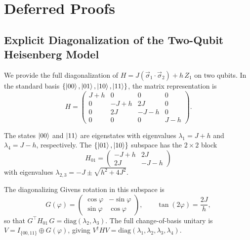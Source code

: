 \appendix

\section{Deferred Proofs}
\label{app:proofs}

\subsection{Explicit Diagonalization of the Two-Qubit
	Heisenberg Model}
\label{app:heisenberg-diag}

We provide the full diagonalization of
$H = J(\vec\sigma_1 \cdot \vec\sigma_2) + h\,Z_1$
on two qubits.  In the standard basis
$\{\ket{00}, \ket{01}, \ket{10}, \ket{11}\}$,
the matrix representation is
\begin{equation}
	H = \begin{pmatrix}
		J+h & 0    & 0    & 0   \\
		0   & -J+h & 2J   & 0   \\
		0   & 2J   & -J-h & 0   \\
		0   & 0    & 0    & J-h
	\end{pmatrix}.
	\tag{A1}
	\label{eq:heisenberg-matrix}
\end{equation}

The states $\ket{00}$ and $\ket{11}$ are eigenstates with
eigenvalues $\lambda_1 = J+h$ and $\lambda_4 = J-h$,
respectively.  The $\{\ket{01}, \ket{10}\}$ subspace has
the $2\times 2$ block
\begin{equation}
	H_{01} = \begin{pmatrix}
		-J+h & 2J   \\
		2J   & -J-h
	\end{pmatrix}
	\tag{A2}
\end{equation}
with eigenvalues
$\lambda_{2,3} = -J \pm \sqrt{h^2+4J^2}$.

The diagonalizing Givens rotation in this subspace is
\begin{equation}
	G(\varphi) = \begin{pmatrix}
		\cos\varphi & -\sin\varphi \\
		\sin\varphi & \cos\varphi
	\end{pmatrix},
	\qquad
	\tan(2\varphi) = \frac{2J}{h},
	\tag{A3}
\end{equation}
so that $G^\top H_{01}\,G = \mathrm{diag}(\lambda_2,
	\lambda_3)$.  The full change-of-basis unitary is
$V = I_{\{00,11\}} \oplus G(\varphi)$, giving
$V^\dagger H V = \mathrm{diag}(\lambda_1, \lambda_2,
	\lambda_3, \lambda_4)$.

